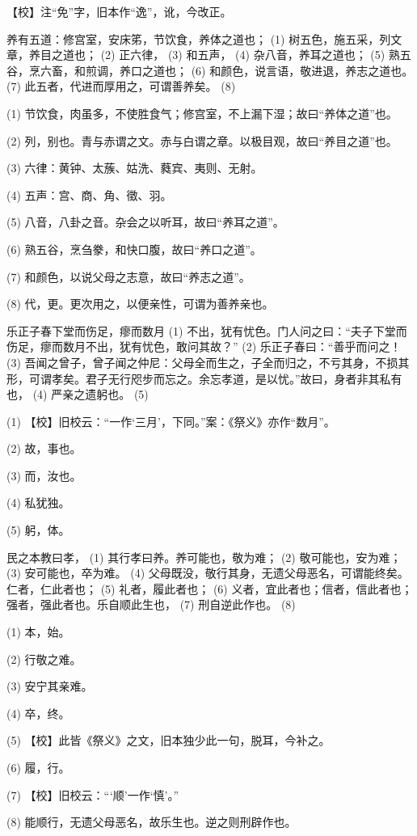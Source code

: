 \documentclass[12pt,UTF8]{ctexbook}
\begin{document}
【校】注“免”字，旧本作“逸”，讹，今改正。

养有五道：修宫室，安床笫，节饮食，养体之道也； (1) 树五色，施五采，列文章，养目之道也； (2) 正六律， (3) 和五声， (4) 杂八音，养耳之道也； (5) 熟五谷，烹六畜，和煎调，养口之道也； (6) 和颜色，说言语，敬进退，养志之道也。 (7) 此五者，代进而厚用之，可谓善养矣。 (8)

(1) 节饮食，肉虽多，不使胜食气；修宫室，不上漏下湿；故曰“养体之道”也。

(2) 列，别也。青与赤谓之文。赤与白谓之章。以极目观，故曰“养目之道”也。

(3) 六律：黄钟、太蔟、姑洗、蕤宾、夷则、无射。

(4) 五声：宫、商、角、徵、羽。

(5) 八音，八卦之音。杂会之以听耳，故曰“养耳之道”。

(6) 熟五谷，烹刍豢，和快口腹，故曰“养口之道”。

(7) 和颜色，以说父母之志意，故曰“养志之道”。

(8) 代，更。更次用之，以便亲性，可谓为善养亲也。

乐正子春下堂而伤足，瘳而数月 (1) 不出，犹有忧色。门人问之曰：“夫子下堂而伤足，瘳而数月不出，犹有忧色，敢问其故？” (2) 乐正子春曰：“善乎而问之！ (3) 吾闻之曾子，曾子闻之仲尼：父母全而生之，子全而归之，不亏其身，不损其形，可谓孝矣。君子无行咫步而忘之。余忘孝道，是以忧。”故曰，身者非其私有也， (4) 严亲之遗躬也。 (5)

(1) 【校】旧校云：“一作‘三月’，下同。”案：《祭义》亦作“数月”。

(2) 故，事也。

(3) 而，汝也。

(4) 私犹独。

(5) 躬，体。

民之本教曰孝， (1) 其行孝曰养。养可能也，敬为难； (2) 敬可能也，安为难； (3) 安可能也，卒为难。 (4) 父母既没，敬行其身，无遗父母恶名，可谓能终矣。仁者，仁此者也； (5) 礼者，履此者也； (6) 义者，宜此者也；信者，信此者也；强者，强此者也。乐自顺此生也， (7) 刑自逆此作也。 (8)

(1) 本，始。

(2) 行敬之难。

(3) 安宁其亲难。

(4) 卒，终。

(5) 【校】此皆《祭义》之文，旧本独少此一句，脱耳，今补之。

(6) 履，行。

(7) 【校】旧校云：“‘顺’一作‘慎’。”

(8) 能顺行，无遗父母恶名，故乐生也。逆之则刑辟作也。
\end{document}
